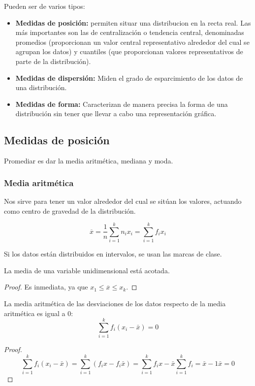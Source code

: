 Pueden ser de varios tipos:

\begin{itemize}
    \item \textbf{Medidas de posición:} permiten situar una distribucion en la recta real. Las más importantes son las de centralización o tendencia central,
          denominadas promedios (proporcionan un valor central representativo alrededor del cual se agrupan los datos) y cuantiles (que proporcionan valores representativos
          de parte de la distribución).
    \item \textbf{Medidas de dispersión:} Miden el grado de esparcimiento de los datos de una distribución.
    \item \textbf{Medidas de forma:} Caracterizan de manera precisa la forma de una distribución sin tener que llevar a cabo una representación gráfica.
\end{itemize}

\subsection{Medidas de posición}
\begin{observacion}
    Promediar es dar la media aritmética, mediana y moda.
\end{observacion}

\subsubsection{Media aritmética}

Nos sirve para tener un valor alrededor del cual se sitúan los valores, actuando como centro de gravedad de la distribución.

$$\overline{x}=\dfrac{1}{n} \sum_{i=1}^{k}n_i x_i = \sum_{i=1}^{k}f_i x_i$$

Si los datos están distribuidos en intervalos, se usan las marcas de clase.\\

\begin{prop}
    La media de una variable unidimensional está acotada.
\end{prop}
\begin{proof}
    Es inmediata, ya que $x_1 \leq \overline{x} \leq x_k$.
\end{proof}

\begin{prop}
    La media aritmética de las desviaciones de los datos respecto de la media aritmética es igual a $0$:
    \begin{equation*}
        \sum^k_{i=1} f_i(x_i-\bar{x})=0
    \end{equation*}
\end{prop}
\begin{proof}
    \begin{equation*}
        \sum^k_{i=1} f_i(x_i-\bar{x}) = \sum^k_{i=1}(f_i x - f_i\bar{x}) = \sum^k_{i=1}f_ix - \bar{x}\sum^k_{i=1}f_i = \bar{x} - 1\bar{x} = 0 
    \end{equation*}
\end{proof}

